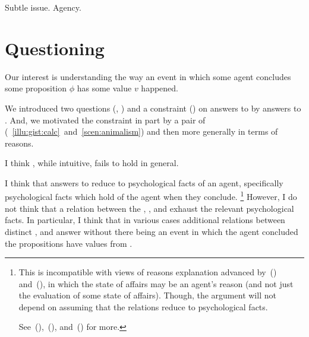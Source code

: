 \begin{note}
  Subtle issue.
  Agency.
\end{note}

\section*{Questioning \issueInclusion{}}

\begin{note}
  Our interest is understanding the way an event in which some agent \vAgent{} concludes some proposition \(\phi\) has some value \(v\) happened.

  We introduced two questions (\qWhy{}, \qHow{}) and a constraint (\issueInclusion{}) on answers to \qWhy{} by answers to \qHow{}.
  And, we motivated the constraint in part by a pair of  (~\ref{illu:gist:calc}~and~\ref{scen:animalism}) and then more generally in terms of reasons.

  I think \issueInclusion{}, while intuitive, fails to hold in general.
\end{note}

\begin{note}
  I think that answers to \qWhy{} reduce to psychological facts of an agent, specifically psychological facts which hold of the agent when they conclude.%
  \footnote{
    This is incompatible with views of reasons explanation advanced by~(\cite{Dancy:2000aa}) and~(\cite{Alvarez:2013aa}), in which the state of affairs may be an agent's reason (and not just the evaluation of some state of affairs).
    Though, the argument will not depend on assuming that the relations reduce to psychological facts.

    See~(\cite[413--418]{Hieronymi:2011aa}),~(\cite[3--5]{DOro:2013vh}), and~(\cite[\S2]{Alvarez:2017aa}) for more.
  }
  However, I do not think that a relation between the , , and \pool{} exhaust the relevant psychological facts.
  In particular, I think that in various cases additional relations between distinct ,  and  answer \qWhy{} without there being an event in which the agent concluded the propositions have values from .
\end{note}

